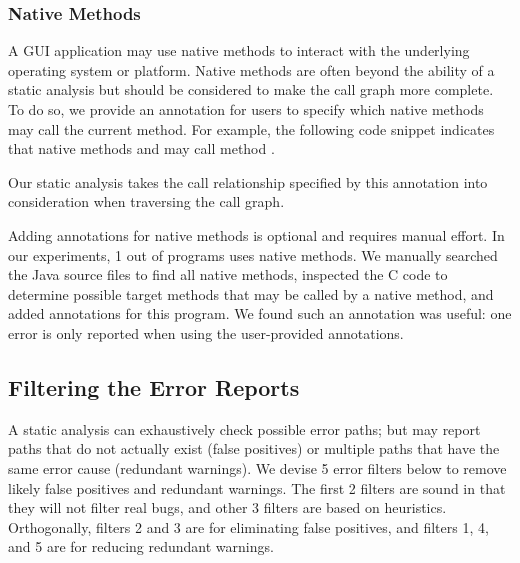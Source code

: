 \subsubsection{Native Methods}
\label{sec:annotation}

A GUI application may use native methods to interact with the underlying
operating system or platform. Native methods are often
beyond the ability of a static analysis but should be considered to make
the call graph more complete. To do so, we provide an annotation 
for users to specify which native methods may call the current method. For example,
the following code snippet indicates that native methods  and 
may call method .

{}

{}


\noindent Our static analysis takes the call relationship specified by this
annotation into consideration when traversing the call graph. 

Adding annotations for native methods is optional and requires manual effort.
In our experiments, 1 out of \subnum programs uses native methods. We manually
searched the Java source files to find all native methods,
inspected the C code to determine possible target methods
that may be called by a native method, and added \annotationnum annotations for this program.
We found such an annotation was useful: one error
is only reported when using the user-provided annotations.

\subsection{Filtering the Error Reports}
\label{sec:heuristic}

A static analysis can exhaustively check possible error paths; but may report
paths that do not actually exist (false positives) or multiple paths
 that have the same error cause (redundant warnings). We devise
5 error filters below to remove likely false positives and redundant warnings.
The first 2 filters are sound in that they will not filter real bugs, and
other 3 filters are based on heuristics. Orthogonally, filters 2
and 3 are for eliminating false positives, and filters 1, 4, and 5
are for reducing redundant warnings.



